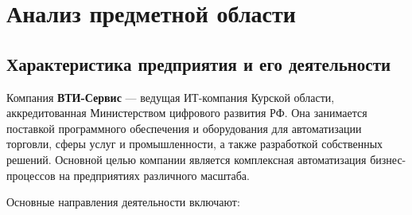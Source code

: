 \section{Анализ предметной области}
\subsection{Характеристика предприятия и его деятельности}

Компания \textbf{ВТИ-Сервис} — ведущая ИТ-компания Курской области, аккредитованная Министерством цифрового развития РФ. Она занимается поставкой программного обеспечения и оборудования для автоматизации торговли, сферы услуг и промышленности, а также разработкой собственных решений. Основной целью компании является комплексная автоматизация бизнес-процессов на предприятиях различного масштаба.

Основные направления деятельности включают:

